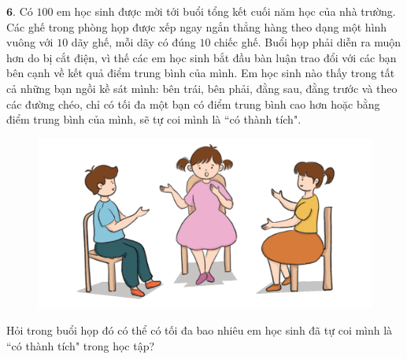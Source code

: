 \begin{multicols}{2}
	\vskip 0.1cm
	$\pmb{6.}$ 	Có $100$ em học sinh được mời tới buổi tổng kết cuối năm học của nhà trường. Các ghế trong phòng họp được xếp ngay ngắn thẳng hàng theo dạng một hình vuông với $10$ dãy ghế, mỗi dãy có đúng $10$ chiếc ghế. Buổi họp phải diễn ra muộn hơn do bị cắt điện, vì thế các em học sinh bắt đầu bàn luận trao đổi với các bạn bên cạnh về kết quả điểm trung bình của mình. Em học sinh nào thấy trong tất cả những bạn ngồi kề sát mình: bên trái, bên phải, đằng sau, đằng trước và theo các đường chéo, chỉ có tối đa một bạn có điểm trung bình cao hơn hoặc bằng điểm trung bình của  mình, sẽ tự coi mình là ``có thành tích".
	\begin{figure}[H]
		\centering
		\vspace*{-5pt}
		\captionsetup{labelformat= empty, justification=centering}
		\includegraphics[width=1\linewidth]{Hinh6}
		\vspace*{-20pt}
	\end{figure}
	Hỏi trong buổi họp đó có thể có tối đa bao nhiêu em học sinh đã tự coi mình là ``có thành tích" trong học tập?
\end{multicols}
%
